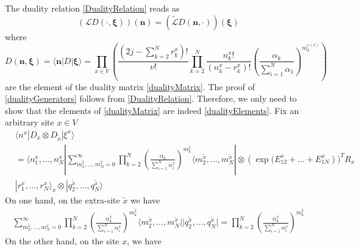 \documentclass[11pt]{article}
\numberwithin{equation}{section}
\numberwithin{equation}{subsection}
\begin{document}
The duality relation \eqref{DualityRelation} reads as
\begin{equation}\label{dualityGenerators}
    \left(\mathcal{L}D(\cdot,\bm{\xi})\right)(\bm{n})=\left(\widetilde{\mathcal{L}}D(\bm{n},\cdot)\right)(\bm{\xi})
\end{equation}
where 
\begin{equation}\label{dualityElements}
	D(\bm{n},\bm{\xi})=\langle \bm{n}|D|\bm{\xi}\rangle=\prod_{x\in V}\left(\frac{(2j-\sum_{k=2}^{N}r_{k}^{x})!}{\nu!}\prod_{k=2}^{N}\frac{n_{k}^{x}!}{(n_{k}^{x}-r_{k}^{x})!}\left(\frac{\alpha_{k}}{\sum_{i=1}^{N}\alpha_{1}}\right)^{m_{k}^{\varepsilon(x)}}\right)
\end{equation}
are the element of the duality matrix \eqref{dualityMatrix}. The proof of \eqref{dualityGenerators} follows from \eqref{DualityRelation}. Therefore, we only need to show that the elements of \eqref{dualityMatrix} are indeed \eqref{dualityElements}.
Fix an arbitrary site $x\in V$
\begin{align*}
	 &\langle n^{x}|D_{x}\otimes D_{\widetilde{x}}|\xi^{x}\rangle\\&=\langle n_{1}^{x},\ldots,n_{N}^{x}|\sum_{m_{2}^{\widetilde{x}},\ldots,m_{N}^{\widetilde{x}}=0}^{\infty}\prod_{k=2}^{N}\left(\frac{\alpha_{k}}{\sum_{i=1}^{N}\alpha_{i}^{x}}\right)^{m_{k}^{\widetilde{x}}}\langle m_{2}^{\widetilde{x}},\ldots,m_{N}^{\widetilde{x}}|
	 \otimes(\exp{(E_{12}^{x}+\ldots+E_{1N}^{x}}))^{T}R_{x}\\&|r_{1}^{x},\ldots,r_{N}^{x}\rangle_{x} \otimes |q_{2}^{\widetilde{x}},\ldots,q_{N}^{\widetilde{x}}\rangle
\end{align*}
On one hand, on the extra-site $\widetilde{x}$ we have 
\begin{align*}
\sum_{m_{2}^{\widetilde{x}},\ldots,m_{N}^{\widetilde{x}}=0}^{\infty}\prod_{k=2}^{N}\left(\frac{\alpha_{k}^{x}}{\sum_{i=1}^{N}\alpha_{i}^{x}}\right)^{m_{k}^{\widetilde{x}}}\langle m_{2}^{\widetilde{x}},\ldots,m_{N}^{\widetilde{x}}||q_{2}^{\widetilde{x}},\ldots,q_{N}^{\widetilde{x}}|=\prod_{k=2}^{N}\left(\frac{\alpha_{k}^{x}}{\sum_{i=1}^{N}\alpha_{i}^{x}}\right)^{m_{k}^{\widetilde{x}}}
\end{align*}
On the other hand, on the site $x$, we have 
\end{document}
